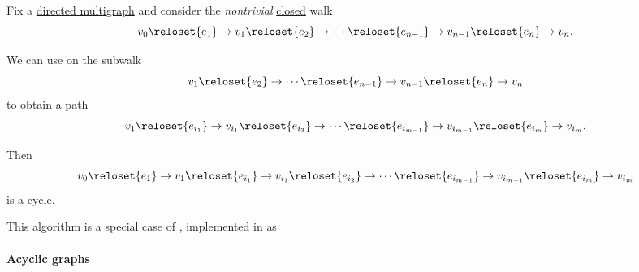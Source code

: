 \begin{algorithm}\label{alg:closed_walk_to_cycle}
  Fix a \hyperref[def:hypergraph/multigraph]{directed multigraph} and consider the \emph{nontrivial} \hyperref[def:graph_walk/closed]{closed} walk
  \begin{equation}\label{eq:alg:closed_walk_to_cycle/src}
    v_0 \reloset {e_1} \to v_1 \reloset {e_2} \to \cdots \reloset {e_{n-1}} \to v_{n-1} \reloset {e_n} \to v_n.
  \end{equation}

  We can use  on the subwalk
  \begin{equation*}
    v_1 \reloset {e_2} \to \cdots \reloset {e_{n-1}} \to v_{n-1} \reloset {e_n} \to v_n
  \end{equation*}
  to obtain a \hyperref[def:graph_walk/path]{path}
  \begin{equation*}
    v_1 \reloset {e_{i_1}} \to v_{i_1} \reloset {e_{i_2}} \to \cdots \reloset {e_{i_{m-1}}} \to v_{i_{m-1}} \reloset {e_{i_m}} \to v_{i_m}.
  \end{equation*}

  Then
  \begin{equation}\label{eq:alg:closed_walk_to_cycle/dest}
    v_0 \reloset {e_1} \to v_1 \reloset {e_{i_1}} \to v_{i_1} \reloset {e_{i_2}} \to \cdots \reloset {e_{i_{m-1}}} \to v_{i_{m-1}} \reloset {e_{i_m}} \to v_{i_m}
  \end{equation}
  is a \hyperref[def:graph_cycle]{cycle}.
\end{algorithm}
\begin{comments}
  \item This algorithm is a special case of , implemented in \cite{notebook:code} as
  \begin{CodeRefDisplay}
  \end{CodeRefDisplay}
\end{comments}

\paragraph{Acyclic graphs}

